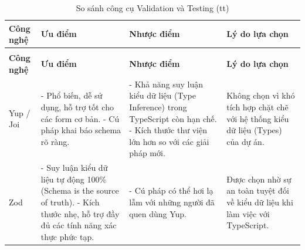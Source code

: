 \begin{center}
    \renewcommand{\arraystretch}{1.5}
    \begin{longtable}{|p{2.5cm}|p{4cm}|p{4cm}|p{3.5cm}|}
        \caption{So sánh công cụ Validation và Testing} \label{tab:validation_testing_comparison}                                                                                        \\
        \hline
        \centering\textbf{Công nghệ}                                     & \centering\textbf{Ưu điểm} & \centering\textbf{Nhược điểm} & \centering\arraybackslash\textbf{Lý do lựa chọn} \\ \hline
        \endfirsthead

        \caption[]{So sánh công cụ Validation và Testing (tt)}                                                                                                                           \\ \hline
        \centering\textbf{Công nghệ}                                     & \centering\textbf{Ưu điểm} & \centering\textbf{Nhược điểm} & \centering\arraybackslash\textbf{Lý do lựa chọn} \\ \hline
        \endhead

        Yup / Joi                                                        &
        - Phổ biến, dễ sử dụng, hỗ trợ tốt cho các form cơ bản. \newline
        - Cú pháp khai báo schema rõ ràng.                               &
        - Khả năng suy luận kiểu dữ liệu (Type Inference) trong TypeScript còn hạn chế. \newline
        - Kích thước thư viện lớn hơn so với các giải pháp mới.          &
        Không chọn vì khó tích hợp chặt chẽ với hệ thống kiểu dữ liệu (Types) của dự án.                                                                                                 \\ \hline

        Zod                                                              &
        - Suy luận kiểu dữ liệu tự động 100\% (Schema is the source of truth). \newline
        - Kích thước nhẹ, hỗ trợ đầy đủ các tính năng xác thực phức tạp. &
        - Cú pháp có thể hơi lạ lẫm với những người đã quen dùng Yup.    &
        Được chọn nhờ sự an toàn tuyệt đối về kiểu dữ liệu khi làm việc với TypeScript.                                                                                                  \\ \hline


\end{longtable}
\end{center}
